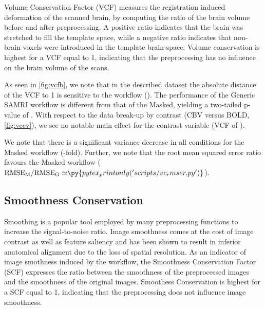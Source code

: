 Volume Conservation Factor (VCF) \cite{ioanas_optimized_2019} measures the registration induced deformation of the scanned brain, by computing the ratio of the brain volume before and after preprocessing.
A positive ratio indicates that the brain was stretched to fill the template space, while a negative ratio indicates that non-brain voxels were introduced in the template brain space.
Volume conservation is highest for a VCF equal to 1, indicating that the preprocessing has no influence on the brain volume of the scans.

As seen in \cref{fig:vcfb}, we note that in the described dataset the absolute distance of the VCF to 1 is sensitive to the workflow
().
The performance of the Generic SAMRI workflow is different from that of the Masked, yielding a two-tailed p-value of .
With respect to the data break-up by contrast (CBV versus BOLD, \cref{fig:vccv}), we see no notable main effect for the contrast variable
(VCF of ).

We note that there is a significant variance decrease in all conditions for the Masked workflow
(-fold).
Further, we note that the root mean squared error ratio favours the Masked workflow
($\mathrm{RMSE_{M}/RMSE_{G}\simeq} \py{pytex_printonly('scripts/vc_rmser.py')}$).

\subsection{Smoothness Conservation}


Smoothing is a popular tool employed by many preprocessing functions to increase the signal-to-noise ratio.
Image smoothness comes at the cost of image contrast as well as feature saliency and has been shown to result in inferior anatomical alignment \cite{fmriprep} due to the loss of spatial resolution.
As an indicator of image smothness induced by the workflow, the Smoothness Conservation Factor (SCF) \cite{ioanas_optimized_2019} expresses the ratio between the smoothness of the preprocessed images and the smoothness of the original images.
Smoothess Conservation is highest for a SCF equal to 1, indicating that the preprocessing does not influence image smoothness.

